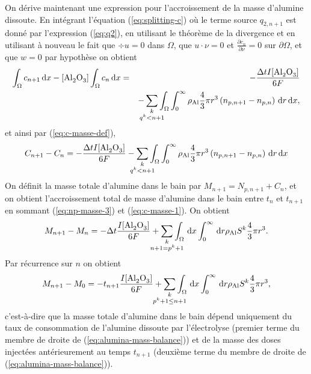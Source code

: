 On dérive maintenant une expression pour l'accroissement de la masse
d'alumine dissoute. En intégrant l'équation (\ref{eq:splitting-c}) où
le terme source $q_{2,n+1}$ est donné par l'expression (\ref{eq:q2}),
en utilisant le théorème de la divergence et en utilisant à nouveau le
fait que $\div u = 0$ dans $\Omega$, que $u\cdot \nu = 0$ et
$\frac{\partial c_n}{\partial \nu} = 0$ sur $\partial \Omega$, et que
$w = 0$ par hypothèse on obtient
\begin{eqnarray*}
[\cee{Al2O3}]\int_\Omega c_{n+1}\intd{x} - [\cee{Al2O3}] \int_\Omega
c_n\intd{x} &=& -\frac{\dt I [\cee{Al2O3}]}{6\faraday}\\
&& - \sum_{\mathclap{\substack{k \\ q^k < n+1}}}
\int_\Omega\int_0^\infty\aluminadensity \frac{4}{3}\pi
r^3 \parent{n_{p,n+1} - n_{p,n}}\intd{r}\intd{x},\nonumber\\
\end{eqnarray*}
et ainsi par (\ref{eq:c-masse-def}),
\begin{eqnarray}
  C_{n+1} - C_n = -\frac{\dt I [\cee{Al2O3}]}{6\faraday} -
\sum_{\mathclap{\substack{k \\ q^k < n+1}}}
\int_\Omega\int_0^\infty\aluminadensity \frac{4}{3}\pi
r^3 \parent{n_{p,n+1} - n_{p,n}}\intd{r}\intd{x}\label{eq:c-masse-1}
\end{eqnarray}
On définit la masse totale d'alumine dans le bain par $M_{n+1} =
N_{p,n+1} + C_n$, et on obtient l'accroissement total de masse
d'alumine dans le bain entre $t_n$ et $t_{n+1}$ en sommant
(\ref{eq:np-masse-3}) et (\ref{eq:c-masse-1}). On obtient
\begin{equation}
  M_{n+1} - M_{n} = - \dt \frac{I[\cee{Al2O3}]}{6\faraday} +
  \sum_{\mathclap{\substack{k\\ n+1 = p^k + 1}}} \int_\Omega\intd{x}\int_0^{\infty}\intd{r}
  \aluminadensity S^k\frac{4}{3}\pi r^3.
\end{equation}
Par récurrence sur $n$ on obtient
\begin{equation}\label{eq:alumina-mass-balance}
  M_{n+1} - M_{0} = - t_{n+1} \frac{I[\cee{Al2O3}]}{6\faraday} +
  \sum_{\mathclap{\substack{k\\  p^k + 1 \leq n+1}}} \int_\Omega\intd{x}\int_0^{\infty}\intd{r}
  \aluminadensity S^k\frac{4}{3}\pi r^3,
\end{equation}
c'est-à-dire que la masse totale d'alumine dans le bain dépend
uniquement du taux de consommation de l'alumine dissoute par
l'électrolyse (premier terme du membre de droite de
(\ref{eq:alumina-mass-balance})) et de la masse des doses
injectées antérieurement au temps $t_{n+1}$ (deuxième terme du membre
de droite de (\ref{eq:alumina-mass-balance})).

